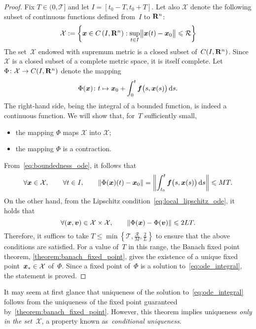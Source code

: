 \begin{proof}
    Fix $T \in (0, \mathcal T]$ and let $I = [t_0 - T, t_0 + T]$.
    Let also $\mathcal X$ denote the following subset of continuous functions defined from~$I$ to $\real^n$:
    \[
    \mathcal X := \left\{ \vect x\in C\left(I, \real^n\right) : \sup_{t \in I} \norm[\big]{\vect x(t) - \vect x_0} \leq \mathcal R \right\}
    \]
    The set~$\mathcal X$ endowed with supremum metric is a closed subset of~$C(I, \real^n)$.
    Since $\mathcal X$ is a closed subset of a complete metric space,
    it is itself complete.
    Let $\Phi \colon \mathcal X \to C(I, \real^n)$ denote the mapping
    \[
        \Phi(\vect x) \colon  t \mapsto  \vect x_0 + \int_{0}^{t} \vect f\bigl(s, \vect x(s)\bigr) \, \d s.
    \]
    The right-hand side, being the integral of a bounded function,
    is indeed a continuous function.
    We will show that, for~$T$ sufficiently small,
    \begin{itemize}
        \item the mapping $\Phi$ maps $\mathcal X$ into $\mathcal X$;
        \item the mapping $\Phi$ is a contraction.
    \end{itemize}
    From~\eqref{eq:boundedness_ode},
    it follows that
    \[
        \forall \vect x \in \mathcal X, \qquad
        \forall t \in I, \qquad
        \vecnorm*{\Phi(\vect x)(t) - \vect x_0} = \vecnorm*{ \int_{t_0}^{t} \vect f\bigl(s, \vect x(s)\bigr) \, \d s }
        \leq M T.
    \]
    On the other hand, from the Lipschitz condition~\eqref{eq:local_lipschitz_ode},
    it holds that
    \[
        \forall (\vect x, \vect v) \in \mathcal X \times \mathcal X, \qquad
        \norm{\Phi(\vect x) - \Phi(\vect v)} \leq 2 L T.
    \]
    Therefore, it suffices to take $T \leq \min \left\{ \mathcal T, \frac{\mathcal R}{M}, \frac{2}{L} \right\}$ to ensure that the above conditions are satisfied.
    For a value of~$T$ in this range,
    the Banach fixed point theorem, \cref{theorem:banach_fixed_point},
    gives the existence of a unique fixed point~$\vect x_* \in \mathcal X$ of~$\Phi$.
    Since a fixed point of~$\Phi$ is a solution to~\eqref{eq:ode_integral},
    the statement is proved.
\end{proof}
It may seem at first glance that uniqueness of the solution to~\eqref{eq:ode_integral} follows from the uniqueness of the fixed point guaranteed by~\cref{theorem:banach_fixed_point}.
However, this theorem implies uniqueness \emph{only in the set~$\mathcal X$},
a property known as~\emph{conditional uniqueness}.
